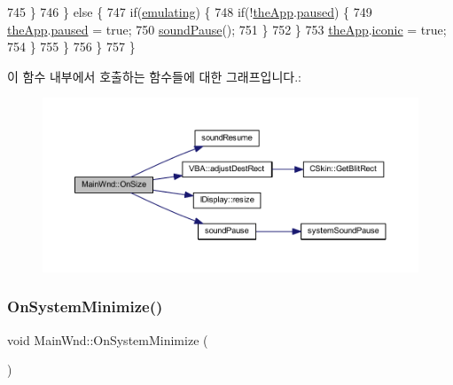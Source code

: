 \begin{DoxyCode}
745         \}
746       \} \textcolor{keywordflow}{else} \{
747         \textcolor{keywordflow}{if}(\mbox{\hyperlink{gb_globals_8h_af9cc36078b1b311753963297ae7f2a74}{emulating}}) \{
748           \textcolor{keywordflow}{if}(!\mbox{\hyperlink{_v_b_a_8cpp_a8095a9d06b37a7efe3723f3218ad8fb3}{theApp}}.\mbox{\hyperlink{class_v_b_a_af7447bf3bf3f93948d2757e4cb223cfc}{paused}}) \{
749             \mbox{\hyperlink{_v_b_a_8cpp_a8095a9d06b37a7efe3723f3218ad8fb3}{theApp}}.\mbox{\hyperlink{class_v_b_a_af7447bf3bf3f93948d2757e4cb223cfc}{paused}} = \textcolor{keyword}{true};
750             \mbox{\hyperlink{_sound_8cpp_a0716e7957671de324eeaa4ac1729d6b7}{soundPause}}();
751           \}
752         \}
753         \mbox{\hyperlink{_v_b_a_8cpp_a8095a9d06b37a7efe3723f3218ad8fb3}{theApp}}.\mbox{\hyperlink{class_v_b_a_a8507ddf862a4e87df9491b5de3b121c1}{iconic}} = \textcolor{keyword}{true};                  
754       \}
755     \}
756   \}
757 \}
\end{DoxyCode}
이 함수 내부에서 호출하는 함수들에 대한 그래프입니다.\+:
\nopagebreak
\begin{figure}[H]
\begin{center}
\leavevmode
\includegraphics[width=350pt]{class_main_wnd_a8aae2e29b1e1426dbfce42deade38485_cgraph}
\end{center}
\end{figure}
\mbox{\label{class_main_wnd_a0fe0ca31c45bc8041267a67eabb9f28e}} 
\subsubsection{\texorpdfstring{On\+System\+Minimize()}{OnSystemMinimize()}}
{\footnotesize\ttfamily void Main\+Wnd\+::\+On\+System\+Minimize (\begin{DoxyParamCaption}{ }\end{DoxyParamCaption})}



